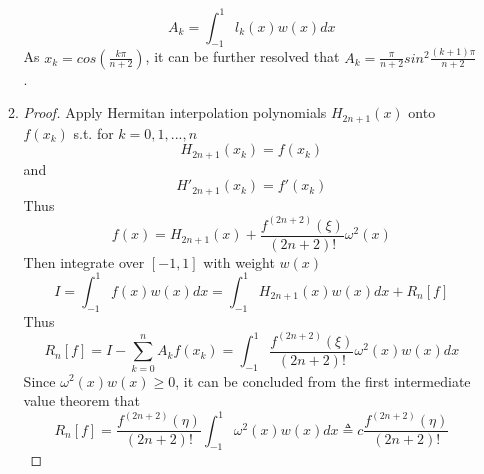 \documentclass[paper=a4, fontsize=11pt]{scrartcl} %
\numberwithin{equation}{section} %
\numberwithin{figure}{section} %
\numberwithin{table}{section} %
\begin{document}
\begin{enumerate}
\begin{enumerate}
				\begin{equation}
					A_k = \int_{-1}^{1} l_k(x)w(x)dx
				\end{equation}
				As $x_k = cos(\frac{k\pi}{n+2})$, it can be further resolved that $A_k = \frac{\pi}{n+2}sin^2\frac{(k+1)\pi}{n+2}$.
			\item 
				\begin{proof}
					Apply Hermitan interpolation polynomials $H_{2n+1}(x)$ onto $f(x_k)$ s.t. for $k = 0, 1, ... , n$
					\begin{equation}
						H_{2n+1}(x_k) = f(x_k) 
					\end{equation}
					and
					\begin{equation}
						H'_{2n+1}(x_k) = f'(x_k)
					\end{equation}
					Thus
					\begin{equation}
						f(x) = H_{2n+1}(x) + \frac{f^{(2n+2)}(\xi)}{(2n+2)!}\omega^2(x)
					\end{equation}
					Then integrate over $[-1, 1]$ with weight $w(x)$
					\begin{equation}
						I = \int_{-1}^{1} f(x) w(x) dx = \int_{-1}^{1} H_{2n+1}(x) w(x)dx + R_n[f]
					\end{equation}
					Thus
					\begin{equation}
						R_n[f] = I- \sum_{k=0}^{n}A_k f(x_k) = \int_{-1}^{1}\frac{f^{(2n+2)}(\xi)}{(2n+2)!}\omega^2(x)w(x)dx
					\end{equation}
					Since $\omega^2(x)w(x) \geq 0$, it can be concluded from the first intermediate value theorem that
					\begin{equation}
						R_n[f] = \frac{f^{(2n+2)}(\eta)}{(2n+2)!}\int_{-1}^{1}\omega^2(x)w(x)dx \triangleq c  \frac{f^{(2n+2)}(\eta)}{(2n+2)!}
					\end{equation}
					
				\end{proof}
			
		\end{enumerate}
\end{enumerate}
\end{document}
